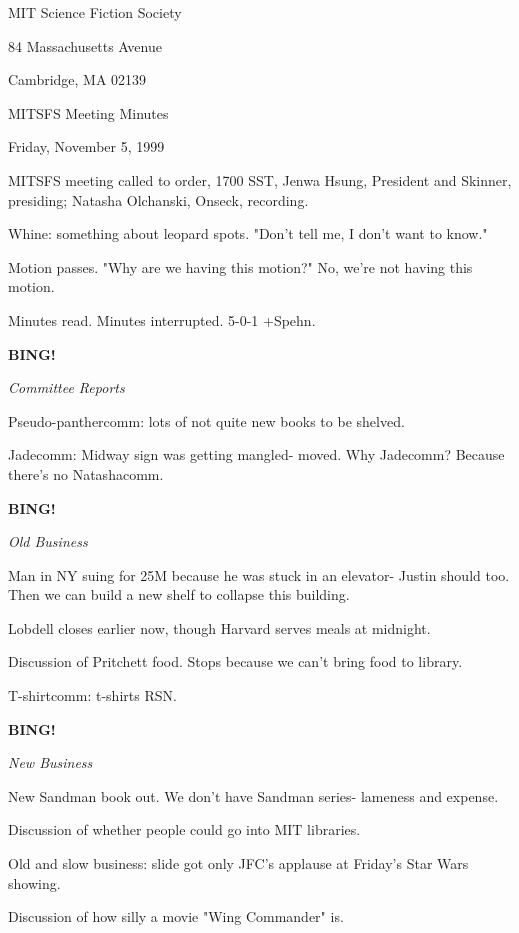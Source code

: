 \documentclass[12pt]{article}
\newcommand{\bing}{{\bf BING!} }
\newcommand{\goto}[1]{\bing \vskip 12pt \centerline{{\em{#1}}}}
\begin{document}
\begin{center}

MIT Science Fiction Society 

84 Massachusetts Avenue

Cambridge, MA 02139

\vspace{12pt}

MITSFS Meeting Minutes 

Friday, November 5, 1999

\end{center}
 
\vspace{18pt}

\setlength{\parskip}{6pt}

\noindent
MITSFS meeting called to order, 1700 SST,
Jenwa Hsung, President and Skinner, presiding; Natasha Olchanski, Onseck, recording.

Whine: something about leopard spots. "Don't tell me, I don't want to know."

Motion passes. "Why are we having this motion?" No, we're not having this motion.

Minutes read. Minutes interrupted. 5-0-1 +Spehn.

\goto{Committee Reports}

Pseudo-panthercomm: lots of not quite new books to be shelved.

Jadecomm: Midway sign was getting mangled- moved. Why Jadecomm? Because there's no Natashacomm.

\goto{Old Business}

Man in NY suing for 25M because he was stuck in an elevator- Justin should too. Then we can build a new shelf to collapse this building.

Lobdell closes earlier now, though Harvard serves meals at midnight.

Discussion of Pritchett food. Stops because we can't bring food to library.

T-shirtcomm: t-shirts RSN.

\goto{New Business}

New Sandman book out. We don't have Sandman series- lameness and expense.

Discussion of whether people could go into MIT libraries.

Old and slow business: slide got only JFC's applause at Friday's Star Wars showing.

Discussion of how silly a movie "Wing Commander" is.
\end{document}
